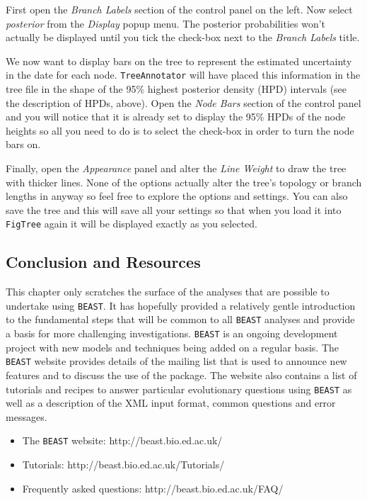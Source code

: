 \documentclass[cup7b, english]{cupbook}
\begin{document}
First open the {\it Branch Labels} section of
the control panel on the left. Now select {\it posterior} from the {\it Display} popup menu. The
posterior probabilities won't actually be displayed until you tick the check-box next to the
{\it Branch Labels} title.

We now want to display bars on the tree to represent the estimated uncertainty in the date for
each node. \texttt{TreeAnnotator} will have placed this information in the tree file in the shape of the
95\% highest posterior density (HPD) intervals (see the description of HPDs, above). Open the
{\it Node Bars} section of the control panel and you will notice that it is already
set to display the 95\% HPDs of the node heights so all you need to do is to select the check-box in
order to turn the node bars on.

Finally, open the {\it Appearance} panel and alter the {\it Line Weight} to draw the tree with thicker
lines. None of the options actually alter the tree's topology or branch lengths in anyway so feel free
to explore the options and settings. You can also save the tree and this will save all your settings
so that when you load it into \texttt{FigTree} again it will be displayed exactly as you selected.

\subsection{Conclusion and Resources}

This chapter only scratches the surface of the analyses that are possible to undertake using
\texttt{BEAST}. It has hopefully provided a relatively gentle introduction to the fundamental steps that will
be common to all \texttt{BEAST} analyses and provide a basis for more challenging investigations. \texttt{BEAST} is an
ongoing development project with new models and techniques being added on a regular basis. The \texttt{BEAST} website
provides details of the mailing list that is used to announce new features and to discuss the use
of the package. The website also contains a list of tutorials and recipes
 to answer particular evolutionary questions using \texttt{BEAST} as well as a description of the XML
input format, common questions and error messages.

 \begin{itemize}
 \item The \texttt{BEAST} website:
 http://beast.bio.ed.ac.uk/
 \item Tutorials:
 http://beast.bio.ed.ac.uk/Tutorials/
 \item Frequently asked questions:
 http://beast.bio.ed.ac.uk/FAQ/
 \end{itemize}
\end{document}
